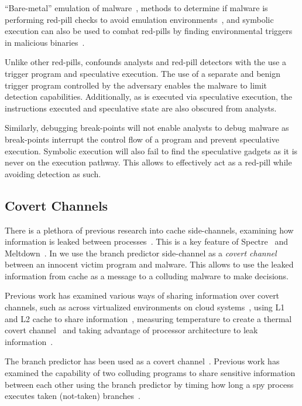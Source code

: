 
``Bare-metal'' emulation of malware~\cite{kirat2011barebox}, methods to
determine if malware is performing red-pill checks to avoid emulation
environments~\cite{kirat2014barecloud}, and symbolic execution can also be used
to combat red-pills by finding environmental triggers in malicious
binaries~\cite{schwartz2010all}. 

Unlike other red-pills, \speculake confounds analysts and red-pill detectors
with the use a trigger program and speculative execution. The use of a separate
and benign trigger program controlled by the adversary enables the \speculake
malware to limit detection capabilities. Additionally, as \speculake is executed
via speculative execution, the instructions executed and speculative state are 
also obscured from analysts. 

Similarly, debugging break-points will not enable analysts to debug \speculake
malware as break-points interrupt the control flow of a program and prevent
speculative execution. Symbolic execution will also fail to find the speculative
gadgets as it is never on the execution pathway. This allows \speculake to
effectively act as a red-pill while avoiding detection as such.

\subsection{Covert Channels}

There is a plethora of previous research into cache side-channels, examining how
information is leaked between
processes~\cite{percival2005cache,zhang2012cross,osvik2006cache}. This is a key
feature of Spectre~\cite{spectre} and Meltdown~\cite{meltdown}. In \speculake we
use the branch predictor side-channel as a \emph{covert
channel}~\cite{lampson1973note} between an innocent victim program and malware.
This allows \speculake to use the leaked information from cache as a message to
a colluding malware to make decisions. 

Previous work has examined various ways of sharing information over covert
channels, such as across virtualized environments on cloud
systems~\cite{wu2012whispers}, using L1 and L2 cache to share
information~\cite{percival2005cache}, measuring temperature to create a thermal
covert channel~\cite{masti2015thermal, bartolini2016capacity} and taking
advantage of processor architecture to leak information~\cite{wang2006covert}.

The branch predictor has been used as a covert
channel~\cite{evtyushkin2016understanding}. Previous work has examined the
capability of two colluding programs to share sensitive information between each
other using the branch predictor by timing how long a spy process executes taken
(not-taken) branches~\cite{evtyushkin2015covert}.

